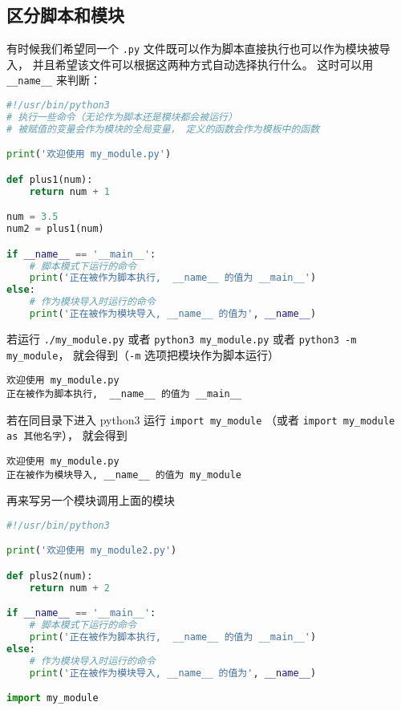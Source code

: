
\begin{issues}
\issueDraft
\end{issues}

\subsection{区分脚本和模块}
有时候我们希望同一个 \verb`.py` 文件既可以作为脚本直接执行也可以作为模块被导入， 并且希望该文件可以根据这两种方式自动选择执行什么。 这时可以用 \verb`__name__` 来判断：
\begin{lstlisting}[language=python, caption=my\_module.py]
#!/usr/bin/python3
# 执行一些命令（无论作为脚本还是模块都会被运行）
# 被赋值的变量会作为模块的全局变量， 定义的函数会作为模板中的函数

print('欢迎使用 my_module.py')

def plus1(num):
    return num + 1

num = 3.5
num2 = plus1(num)

if __name__ == '__main__':
    # 脚本模式下运行的命令
    print('正在被作为脚本执行,  __name__ 的值为 __main__')
else:
    # 作为模块导入时运行的命令
    print('正在被作为模块导入, __name__ 的值为', __name__)
\end{lstlisting}
若运行 \verb`./my_module.py` 或者 \verb`python3 my_module.py` 或者 \verb`python3 -m my_module`， 就会得到（\verb`-m` 选项把模块作为脚本运行）
\begin{lstlisting}[language=none]
欢迎使用 my_module.py
正在被作为脚本执行,  __name__ 的值为 __main__
\end{lstlisting}
若在同目录下进入 python3 运行 \verb`import my_module` （或者 \verb`import my_module as 其他名字`）， 就会得到
\begin{lstlisting}[language=none]
欢迎使用 my_module.py
正在被作为模块导入, __name__ 的值为 my_module
\end{lstlisting}

再来写另一个模块调用上面的模块
\begin{lstlisting}[language=python,caption=my\_module2.py]
#!/usr/bin/python3

print('欢迎使用 my_module2.py')

def plus2(num):
    return num + 2

if __name__ == '__main__':
    # 脚本模式下运行的命令
    print('正在被作为脚本执行,  __name__ 的值为 __main__')
else:
    # 作为模块导入时运行的命令
    print('正在被作为模块导入, __name__ 的值为', __name__)

import my_module
\end{lstlisting}


